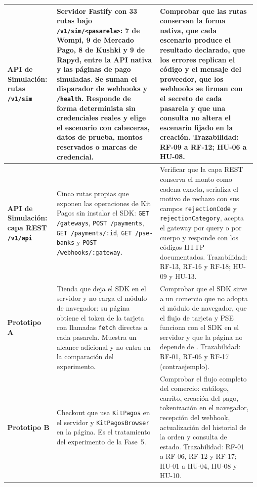 {\begin{xltabular}{\textwidth}{|>{\raggedright\arraybackslash}p{3.1cm}|>{\raggedright\arraybackslash}X|>{\raggedright\arraybackslash}X|}
\textbf{API de Simulación: rutas \texttt{/v1/sim}} &
Servidor Fastify con 33 rutas bajo \texttt{/v1/sim/<pasarela>}: 7 de Wompi, 9 de Mercado Pago, 8 de Kushki y 9 de Rapyd, entre la API nativa y las páginas de pago simuladas. Se suman el disparador de webhooks y \texttt{/health}. Responde de forma determinista sin credenciales reales y elige el escenario con cabeceras, datos de prueba, montos reservados o marcas de credencial. &
Comprobar que las rutas conservan la forma nativa, que cada escenario produce el resultado declarado, que los errores replican el código y el mensaje del proveedor, que los webhooks se firman con el secreto de cada pasarela y que una consulta no altera el escenario fijado en la creación. Trazabilidad: RF-09 a RF-12; HU-06 a HU-08. \\ \hline
\textbf{API de Simulación: capa REST \texttt{/v1/api}} &
Cinco rutas propias que exponen las operaciones de Kit Pagos sin instalar el SDK: \texttt{GET /gateways}, \texttt{POST /payments}, \texttt{GET /payments/:id}, \texttt{GET /pse-banks} y \texttt{POST /webhooks/:gateway}. &
Verificar que la capa REST conserva el monto como cadena exacta, serializa el motivo de rechazo con sus campos \texttt{rejectionCode} y \texttt{rejectionCategory}, acepta el gateway por query o por cuerpo y responde con los códigos HTTP documentados. Trazabilidad: RF-13, RF-16 y RF-18; HU-09 y HU-13. \\ \hline
\textbf{Prototipo A} \newline {} &
Tienda que deja el SDK en el servidor y no carga el módulo de navegador: su página obtiene el token de la tarjeta con llamadas \texttt{fetch} directas a cada pasarela. Muestra un alcance adicional y no entra en la comparación del experimento. &
Comprobar que el SDK sirve a un comercio que no adopta el módulo de navegador, que el flujo de tarjeta y PSE funciona con el SDK en el servidor y que la página no depende de . Trazabilidad: RF-01, RF-06 y RF-17 (contraejemplo). \\ \hline
\textbf{Prototipo B} \newline {} &
Checkout que usa \texttt{KitPagos} en el servidor y \texttt{KitPagosBrowser} en la página. Es el tratamiento del experimento de la Fase~5. &
Comprobar el flujo completo del comercio: catálogo, carrito, creación del pago, tokenización en el navegador, recepción del webhook, actualización del historial de la orden y consulta de estado. Trazabilidad: RF-01 a RF-06, RF-12 y RF-17; HU-01 a HU-04, HU-08 y HU-10. \\ \hline

\end{xltabular}}
